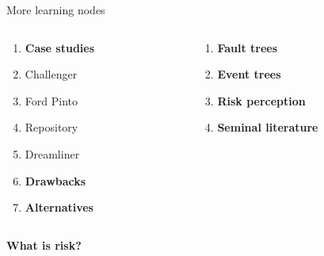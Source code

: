 \documentclass[aspectratio=1610,pdftex,dvipsnames,compress,xcolor={dvipsnames}]{beamer}
\begin{document}
\begin{frame}{More learning nodes}
    \begin{columns}[t]

        \begin{column}{0.50\textwidth}
            \begin{enumerate}[series=outerlist,topsep=0pt,itemsep=1pt,leftmargin=*,label=(\arabic*)]
                \item[]\textbf{Case studies}
                \item[]Challenger
                \item[]Ford Pinto  
                \item[]Repository
                \item[]Dreamliner
                    \vspace{0.10in}
                \item[]\textbf{Drawbacks}
                    \vspace{0.10in}
                \item[]\textbf{Alternatives}
            \end{enumerate}
        \end{column}

        \begin{column}{0.50\textwidth}
            \begin{enumerate}[series=outerlist,topsep=0pt,itemsep=1pt,leftmargin=*,label=(\arabic*)]
                \item[]\hfill\textbf{Fault trees}
                    \vspace{0.10in}
                \item[]\hfill\textbf{Event trees}
                    \vspace{0.10in}
                \item[]\hfill\textbf{Risk perception}
                    \vspace{0.10in}
                \item[]\hfill\textbf{Seminal literature}
            \end{enumerate}
        \end{column}

    \end{columns}
\end{frame}


\begin{frame}[plain]{}
    \centering\LARGE\textbf{What is risk?}
\end{frame}
\end{document}
